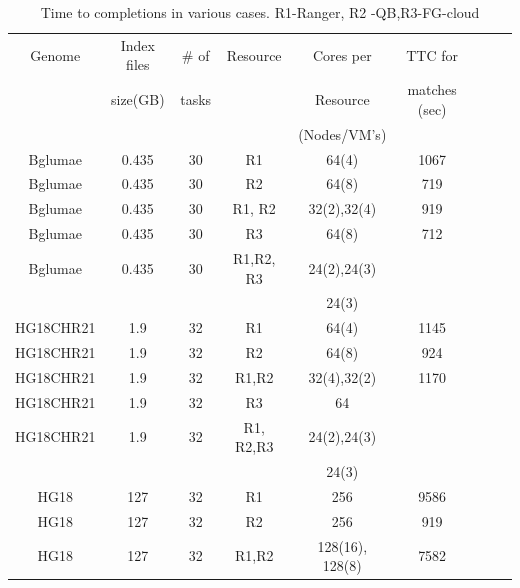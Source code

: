 \documentclass{sig-alternate}
\begin{document}
 \begin{table}
 \tiny
 \begin{tabular}{|c|c|c|c|c|c|c|c|c|} 
 \hline 
Genome & Index files       & \# of      & Resource    & Cores  per           &	TTC for \\
                 &  size(GB)    &  tasks  & & Resource & matches (sec)\\
  &   &   & &(Nodes/VM's) & \\

\hline
 Bglumae &0.435& 30   &R1&	64(4)	&1067 \\
\hline                  
Bglumae &0.435& 30   & R2	&	64(8)	&719 \\
\hline
 Bglumae &0.435& 30   &R1, R2	&	32(2),32(4) &919 \\
\hline
 Bglumae &0.435& 30   &R3 &	64(8)	&712 \\
\hline
 Bglumae &0.435 & 30   & R1,R2, R3&	24(2),24(3)&\\
&&& 	 &24(3)&\\
\hline
\hline
HG18CHR21 &1.9& 32   &R1	&	64(4)&1145 \\
\hline
HG18CHR21 &1.9& 32   &R2	&	64(8)	&924 \\
\hline
HG18CHR21 &1.9& 32   &R1,R2	&	32(4),32(2)	&1170 \\
\hline
HG18CHR21 &1.9& 32   &R3	&	64	& \\
\hline
HG18CHR21 &1.9& 32   &R1, R2,R3	&	24(2),24(3)	& \\
&&& 	 &24(3)&\\
\hline
\hline
HG18 &127& 32   &R1	&	256	&9586\\
\hline
HG18 &127& 32   &R2	&	256	&919 \\
\hline
HG18 &127& 32   &R1,R2	&	128(16), 128(8)&7582 \\
\hline
\end{tabular}





\caption{  Time to completions in various cases. R1-Ranger, R2 -QB,R3-FG-cloud  }

  \label{table:NGS-Distributed} 
\end{table}
\end{document}
